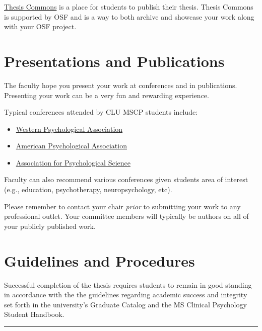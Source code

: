 \documentclass[openany]{book}
\providecommand{\tightlist}{%
  \setlength{\itemsep}{0pt}\setlength{\parskip}{0pt}}
\begin{document}
\href{https://thesiscommons.org/}{Thesis Commons} is a place for students to publish their thesis. Thesis Commons is supported by OSF and is a way to both archive and showcase your work along with your OSF project.

\hypertarget{presentations-and-publications}{%
\chapter{Presentations and Publications}\label{presentations-and-publications}}

The faculty hope you present your work at conferences and in publications. Presenting your work can be a very fun and rewarding experience.

Typical conferences attended by CLU MSCP students include:

\begin{itemize}
\tightlist
\item
  \href{https://westernpsych.org/convention/}{Western Psychological Association}
\item
  \href{https://convention.apa.org/}{American Psychological Association}
\item
  \href{https://www.psychologicalscience.org/conventions/annual}{Association for Psychological Science}
\end{itemize}

Faculty can also recommend various conferences given students area of interest (e.g., education, psychotherapy, neuropsychology, etc).

Please remember to contact your chair \emph{prior} to submitting your work to any professional outlet. Your committee members will typically be authors on all of your publicly published work.

\hypertarget{guidelines-and-procedures}{%
\chapter{Guidelines and Procedures}\label{guidelines-and-procedures}}

Successful completion of the thesis requires students to remain in good standing in accordance with the the guidelines regarding academic success and integrity set forth in the university's Graduate Catalog and the MS Clinical Psychology Student Handbook.

\begin{center}\rule{0.5\linewidth}{0.5pt}\end{center}
\end{document}
